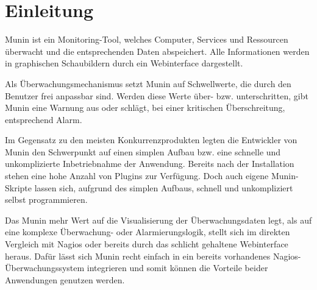 \section{Einleitung}

Munin ist ein Monitoring-Tool, welches Computer, Services und Ressourcen überwacht und die entsprechenden Daten abspeichert. Alle Informationen werden in graphischen Schaubildern durch ein Webinterface dargestellt.

Als Überwachungsmechanismus setzt Munin auf Schwellwerte, die durch den Benutzer frei anpassbar sind.
Werden diese Werte über- bzw. unterschritten, gibt Munin eine Warnung aus oder schlägt, bei einer kritischen Überschreitung, entsprechend Alarm.

Im Gegensatz zu den meisten Konkurrenzprodukten legten die Entwickler von Munin den Schwerpunkt auf einen simplen Aufbau bzw. eine schnelle und unkomplizierte Inbetriebnahme der Anwendung.
Bereits nach der Installation stehen eine hohe Anzahl von Plugins zur Verfügung.
Doch auch eigene Munin-Skripte lassen sich, aufgrund des simplen Aufbaus, schnell und unkompliziert selbst programmieren.

Das Munin mehr Wert auf die Visualisierung der Überwachungsdaten legt, als auf eine komplexe Überwachung- oder Alarmierungslogik, stellt sich im direkten Vergleich mit Nagios oder bereits durch das schlicht gehaltene Webinterface heraus.
Dafür lässt sich Munin recht einfach in ein bereits vorhandenes Nagios-Überwachungssystem integrieren und somit können die Vorteile beider Anwendungen genutzen werden.